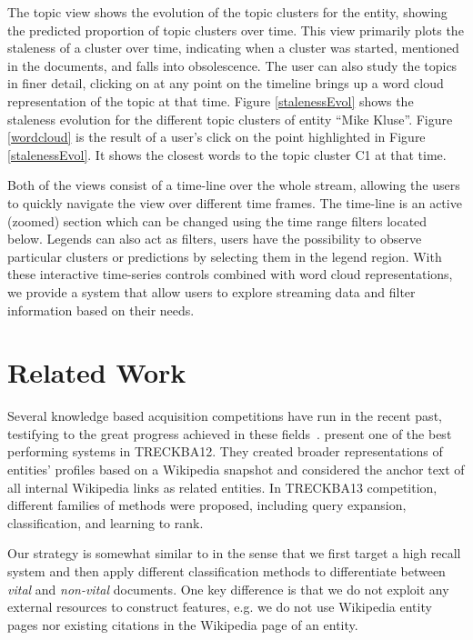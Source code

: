\documentclass{article}
\begin{document}
The topic view shows the evolution of the topic clusters for the entity, showing the predicted proportion of topic clusters over time.
This view primarily plots the staleness of a cluster over time, indicating when a cluster was started, mentioned in the documents, and falls into obsolescence. 
The user can also study the topics in finer detail, clicking on at any point on the timeline brings up a word cloud representation of the topic at that time.
Figure \ref{stalenessEvol} shows the staleness evolution for the different topic clusters of entity ``Mike Kluse''. 
Figure \ref{wordcloud} is the result of a user's click on the point highlighted in Figure \ref{stalenessEvol}. 
It shows the closest words to the topic cluster C1 at that time.

Both of the views consist of a time-line over the whole stream, allowing the users to quickly navigate the view over different time frames.
The time-line is an active (zoomed) section which can be changed using the time range filters located below. Legends can also act as filters, users have the possibility to observe particular clusters or predictions by selecting them in the legend region.
With these interactive time-series controls combined with word cloud representations, we provide a system that allow users to explore streaming data and filter information based on their needs.

\section{Related Work}
\label{related}

Several knowledge based acquisition competitions have run in the recent past, testifying to the great progress achieved in these fields~\cite{gross_doucet_toivonen_trec12}. 
\citet{xitong12} present one of the best performing systems in TRECKBA12. 
They created broader representations of entities' profiles based on a Wikipedia snapshot and considered the anchor text of all internal Wikipedia links as related entities. In TRECKBA13 competition, different families of methods were proposed, including query expansion, classification, and learning to rank. 

Our strategy is somewhat similar to \citet{jingang13} in the sense that we first target a high recall system and then apply different classification methods to differentiate between \emph{vital} and \emph{non-vital} documents. 
One key difference is that we do not exploit any external resources to construct features, e.g. we do not use Wikipedia entity pages nor existing citations in the Wikipedia page of an entity. 
\end{document}

